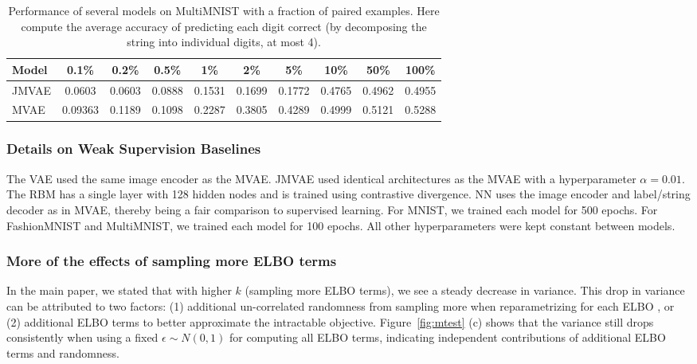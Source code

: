 \begin{table}[tb]
\centering
\scriptsize
\begin{tabular}{ l|c|c|c|c|c|c|c|c|c }
    \toprule
    Model & 0.1\% & 0.2\% & 0.5\% & 1\% & 2\% & 5\% & 10\% & 50\% & 100\% \\
    \hline
    JMVAE & 0.0603 & 0.0603 & 0.0888 & 0.1531 & 0.1699 & 0.1772 & 0.4765 & 0.4962 & 0.4955 \\
    MVAE & 0.09363 & 0.1189 & 0.1098 & 0.2287 & 0.3805 & 0.4289 & 0.4999 & 0.5121 & 0.5288 \\
    \bottomrule
\end{tabular}
\caption{Performance of several models on MultiMNIST with a fraction of paired examples. Here compute the average accuracy of predicting each digit correct (by decomposing the string into individual digits, at most 4).}
\label{table:x_results}
\end{table}

\subsubsection{Details on Weak Supervision Baselines}

The VAE used the same image encoder as the MVAE. JMVAE used identical architectures as the MVAE with a hyperparameter $\alpha = 0.01$. The RBM has a single layer with 128 hidden nodes and is trained using contrastive divergence. NN uses the image encoder and label/string decoder as in MVAE, thereby being a fair comparison to supervised learning. For MNIST, we trained each model for 500 epochs. For FashionMNIST and MultiMNIST, we trained each model for 100 epochs. All other hyperparameters were kept constant between models.

\subsubsection{More of the effects of sampling more ELBO terms}

In the main paper, we stated that with higher $k$ (sampling more ELBO terms), we see a steady decrease in variance. This drop in variance can be attributed to two factors: (1) additional un-correlated randomness from sampling more when reparametrizing for each ELBO \cite{burda2015importance}, or (2) additional ELBO terms to better approximate the intractable objective. Figure~\ref{fig:mtest} (c) shows that the variance still drops consistently when using a fixed $\epsilon \sim N(0, 1)$ for computing all ELBO terms, indicating independent contributions of additional ELBO terms and randomness.


